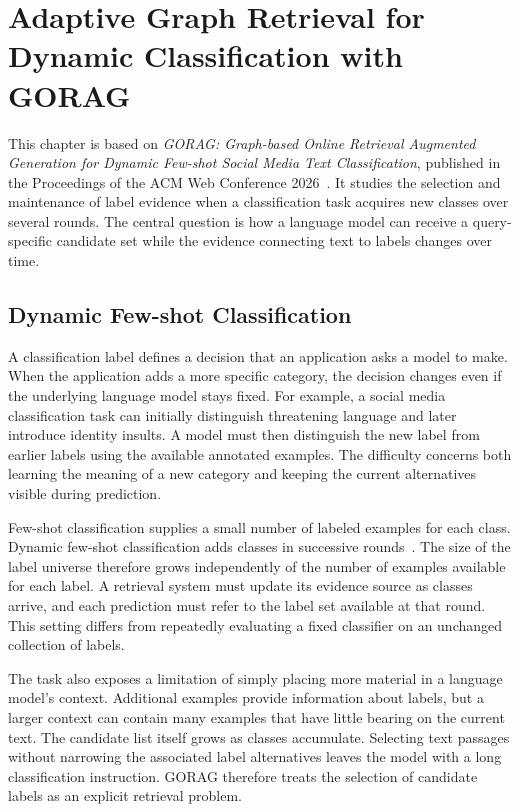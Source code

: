 \chapter{Adaptive Graph Retrieval for Dynamic Classification with GORAG}
\label{ch:gorag}

This chapter is based on \emph{GORAG: Graph-based Online Retrieval Augmented Generation for Dynamic Few-shot Social Media Text Classification}, published in the Proceedings of the ACM Web Conference 2026~\cite{gorag-paper}. It studies the selection and maintenance of label evidence when a classification task acquires new classes over several rounds. The central question is how a language model can receive a query-specific candidate set while the evidence connecting text to labels changes over time.

\section{Dynamic Few-shot Classification}
\label{sec:gorag:task}

A classification label defines a decision that an application asks a model to make. When the application adds a more specific category, the decision changes even if the underlying language model stays fixed. For example, a social media classification task can initially distinguish threatening language and later introduce identity insults. A model must then distinguish the new label from earlier labels using the available annotated examples. The difficulty concerns both learning the meaning of a new category and keeping the current alternatives visible during prediction.

Few-shot classification supplies a small number of labeled examples for each class. Dynamic few-shot classification adds classes in successive rounds~\cite{gorag-xia-etal-2021-incremental}. The size of the label universe therefore grows independently of the number of examples available for each label. A retrieval system must update its evidence source as classes arrive, and each prediction must refer to the label set available at that round. This setting differs from repeatedly evaluating a fixed classifier on an unchanged collection of labels.

The task also exposes a limitation of simply placing more material in a language model's context. Additional examples provide information about labels, but a larger context can contain many examples that have little bearing on the current text. The candidate list itself grows as classes accumulate. Selecting text passages without narrowing the associated label alternatives leaves the model with a long classification instruction. GORAG therefore treats the selection of candidate labels as an explicit retrieval problem.

